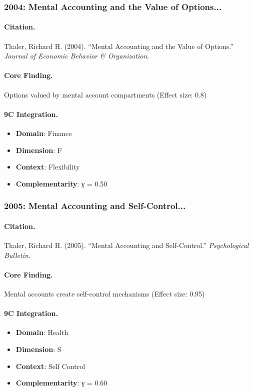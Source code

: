 \subsubsection{2004: Mental Accounting and the Value of Options...}

\paragraph{Citation.}
Thaler, Richard H. (2004). ``Mental Accounting and the Value of Options.''
\textit{Journal of Economic Behavior & Organization}.

\paragraph{Core Finding.}
Options valued by mental account compartments (Effect size: 0.8)

\paragraph{9C Integration.}
\begin{itemize}[nosep]
  \item \textbf{Domain}: Finance
  \item \textbf{Dimension}: F
  \item \textbf{Context}: Flexibility
  \item \textbf{Complementarity}: γ = 0.50
\end{itemize}

\subsubsection{2005: Mental Accounting and Self-Control...}

\paragraph{Citation.}
Thaler, Richard H. (2005). ``Mental Accounting and Self-Control.''
\textit{Psychological Bulletin}.

\paragraph{Core Finding.}
Mental accounts create self-control mechanisms (Effect size: 0.95)

\paragraph{9C Integration.}
\begin{itemize}[nosep]
  \item \textbf{Domain}: Health
  \item \textbf{Dimension}: S
  \item \textbf{Context}: Self Control
  \item \textbf{Complementarity}: γ = 0.60
\end{itemize}

